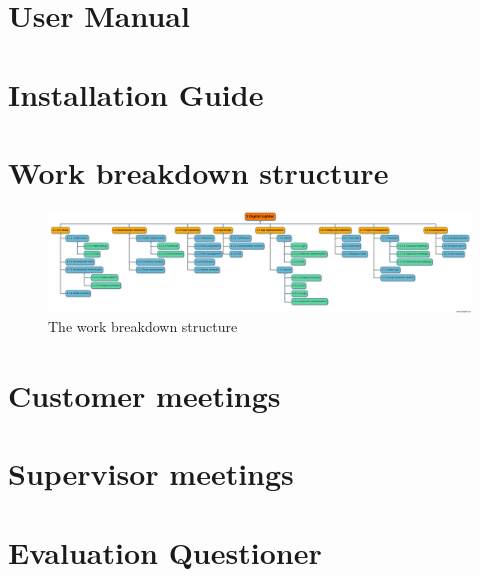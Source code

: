 \chapter{User Manual}

\chapter{Installation Guide}

\chapter{Work breakdown structure} \label{txt:work_breakdown_structure}

\begin{figure}[!h]
	\centering
		\includegraphics[width=12cm, angle=90]{planning/wbs.png}
	\caption{The work breakdown structure}
	\label{fig:wbs}
\end{figure}

\chapter{Customer meetings}

\chapter{Supervisor meetings}

\chapter{Evaluation Questioner}